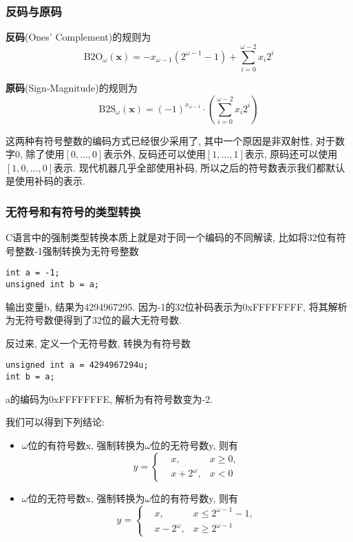 \documentclass[utf8]{ctexart} %
\begin{document}
\subsubsection{反码与原码}
\textbf{反码}(Ones' Complement)的规则为$$\mathrm{B2O}_{\omega}(\boldsymbol{x})=-x_{\omega-1}(2^{\omega-1}-1)+\sum_{i=0}^{\omega-2}x_i2^i$$
\par
\textbf{原码}(Sign-Magnitude)的规则为$$\mathrm{B2S}_{\omega}(\boldsymbol{x})=(-1)^{x_{\omega-1}}\cdot(\sum_{i=0}^{\omega-2}x_i2^i)$$
\par 
这两种有符号整数的编码方式已经很少采用了, 其中一个原因是非双射性, 对于数字0, 除了使用$[0,\dots,0]$表示外, 反码还可以使用$[1,\dots,1]$表示, 原码还可以使用$[1,0,\dots,0]$表示. 现代机器几乎全部使用补码, 所以之后的符号数表示我们都默认是使用补码的表示.
\subsubsection{无符号和有符号的类型转换}
C语言中的强制类型转换本质上就是对于同一个编码的不同解读, 比如将32位有符号整数-1强制转换为无符号整数
\lstset{language=c++}
\begin{lstlisting}
int a = -1;
unsigned int b = a;
\end{lstlisting}
输出变量b, 结果为4294967295. 因为-1的32位补码表示为0xFFFFFFFF, 将其解析为无符号数便得到了32位的最大无符号数.\par 
反过来, 定义一个无符号数, 转换为有符号数
\lstset{language=c++}
\begin{lstlisting}
unsigned int a = 4294967294u;
int b = a;
\end{lstlisting}
a的编码为0xFFFFFFFE, 解析为有符号数变为-2.\par 
我们可以得到下列结论:
\begin{itemize}
	\item $\omega$位的有符号数x, 强制转换为$\omega$位的无符号数y, 则有
	$$y=\left\{
	\begin{aligned}
	&x, &x\geq0,\\
	&x+2^{\omega}, &x<0
	\end{aligned}
	\right.$$
	\item $\omega$位的无符号数x, 强制转换为$\omega$位的有符号数y, 则有
	$$y=\left\{
	\begin{aligned}
	&x, &x\leq2^{\omega-1}-1,\\
	&x-2^{\omega}, &x\geq2^{\omega-1}
	\end{aligned}
	\right.$$
\end{itemize}
\end{document}
